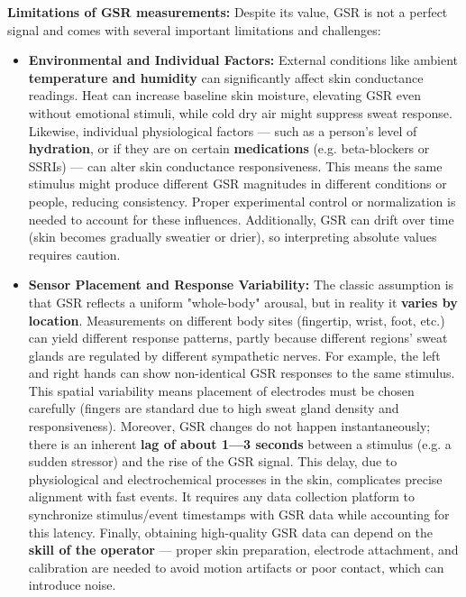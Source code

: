 \textbf{Limitations of GSR measurements:} Despite its value, GSR is not a
perfect signal and comes with several important limitations and
challenges\cite{ElectrodermalActivityWiki}\cite{ElectrodermalActivityWiki}:

\begin{itemize}
\item \textbf{Environmental and Individual Factors:} External conditions like
  ambient \textbf{temperature and humidity} can significantly affect skin
  conductance
  readings\cite{ElectrodermalActivityWiki}.
  Heat can increase baseline skin moisture, elevating GSR even without
  emotional stimuli, while cold dry air might suppress sweat response.
  Likewise, individual physiological factors --- such as a person's level
  of \textbf{hydration}, or if they are on certain \textbf{medications} (e.g.
  beta-blockers or SSRIs) --- can alter skin conductance
  responsiveness\cite{ElectrodermalActivityWiki}.
  This means the same stimulus might produce different GSR magnitudes in
  different conditions or people, reducing consistency. Proper
  experimental control or normalization is needed to account for these
  influences. Additionally, GSR can drift over time (skin becomes
  gradually sweatier or drier), so interpreting absolute values requires
  caution.
\item \textbf{Sensor Placement and Response Variability:} The classic assumption
  is that GSR reflects a uniform "whole-body" arousal, but in reality it
  \textbf{varies by location}. Measurements on different body sites
  (fingertip, wrist, foot, etc.) can yield different response patterns,
  partly because different regions' sweat glands are regulated by
  different sympathetic
  nerves\cite{ElectrodermalActivityWiki}.
  For example, the left and right hands can show non-identical GSR
  responses to the same
  stimulus\cite{ElectrodermalActivityWiki}.
  This spatial variability means placement of electrodes must be chosen
  carefully (fingers are standard due to high sweat gland density and
  responsiveness). Moreover, GSR changes do not happen instantaneously;
  there is an inherent \textbf{lag of about 1---3 seconds} between a stimulus
  (e.g. a sudden stressor) and the rise of the GSR
  signal\cite{ElectrodermalActivityWiki}.
  This delay, due to physiological and electrochemical processes in the
  skin, complicates precise alignment with fast events. It requires any
  data collection platform to synchronize stimulus/event timestamps with
  GSR data while accounting for this latency. Finally, obtaining
  high-quality GSR data can depend on the \textbf{skill of the
  operator}\cite{ElectrodermalActivityWiki}
  --- proper skin preparation, electrode attachment, and calibration are
  needed to avoid motion artifacts or poor contact, which can introduce
  noise.

\end{itemize}
